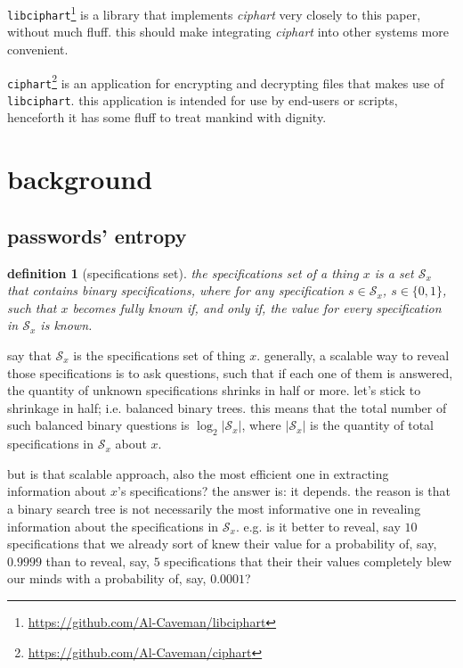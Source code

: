 \documentclass[twocolumn]{article}
\newtheorem{definition}{definition}
\begin{document}
\texttt{libciphart}\footnote{\url{https://github.com/Al-Caveman/libciphart}}
is a library that implements \emph{ciphart} very closely to this paper,
without much fluff.  this should make integrating \emph{ciphart} into other
systems more convenient.

\texttt{ciphart}\footnote{\url{https://github.com/Al-Caveman/ciphart}} is
an application for encrypting and decrypting files that makes use of
\texttt{libciphart}.  this application is intended for use by end-users or
scripts, henceforth it has some fluff to treat mankind with dignity.

\break
\tableofcontents

\section{background}
\subsection{passwords' entropy}\label{sec_pass_entropy}
\begin{definition}[specifications set]
    the specifications set of a thing $x$ is a set $\mathcal{S}_x$ that
    contains binary specifications, where for any specification $s \in
    \mathcal{S}_x$, $s \in \{0,1\}$, such that $x$ becomes fully known if,
    and only if, the value for every specification in $\mathcal{S}_x$ is
    known.
\end{definition}

say that $\mathcal{S}_x$ is the specifications set of thing $x$.  generally,
a scalable way to reveal those specifications is to ask questions, such
that if each one of them is answered, the quantity of unknown
specifications shrinks in half or more.  let's stick to shrinkage in half;
i.e. balanced binary trees.  this means that the total number of such
balanced binary questions is $\log_2 |\mathcal{S}_x|$, where $|\mathcal{S}_x|$
is the quantity of total specifications in $\mathcal{S}_x$ about $x$.

but is that scalable approach, also the most efficient one in extracting
information about $x$'s specifications?  the answer is: it depends.  the
reason is that a binary search tree is not necessarily the most informative
one in revealing information about the specifications in $\mathcal{S}_x$.
e.g. is it better to reveal, say $10$ specifications that we already sort
of knew their value for a probability of, say, $0.9999$ than to reveal,
say, $5$ specifications that their their values completely blew our minds
with a probability of, say, $0.0001$?
\end{document}
